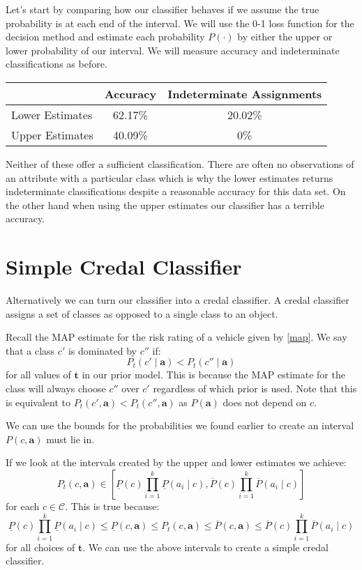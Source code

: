 Let's start by comparing how our classifier behaves if we assume the true probability is at each end of the interval.
We will use the 0-1 loss function for the decision method and estimate each probability $P(\cdot)$ by either the upper or lower probability of our interval.
We will measure accuracy and indeterminate classifications as before.

\begin{center}
	\begin{tabular}{l|c c}
	                & Accuracy & Indeterminate Assignments \\
	\hline
	Lower Estimates & 62.17\%  & 20.02\%            \\
	Upper Estimates & 40.09\%  & 0\%                \\
	\end{tabular}
\end{center}

Neither of these offer a sufficient classification.
There are often no observations of an attribute with a particular class which is why the lower estimates returns indeterminate classifications despite a reasonable accuracy for this data set.
On the other hand when using the upper estimates our classifier has a terrible accuracy.

\section{Simple Credal Classifier}
Alternatively we can turn our classifier into a credal classifier.
A credal classifier assigns a set of classes as opposed to a single class to an object.

Recall the MAP estimate for the risk rating of a vehicle given by \cref{map}.
We say that a class $c'$ is dominated by $c''$ if:
\begin{equation}\label{Credal Dominance}
	P_t(c' \mid \mathbf{a}) < P_t(c'' \mid \mathbf{a})
\end{equation}
for all values of $\mathbf{t}$ in our prior model.
This is because the MAP estimate for the class will always choose $c''$ over $c'$ regardless of which prior is used.
Note that this is equivalent to $P_t(c', \mathbf{a}) < P_t(c'', \mathbf{a})$ as $P(\mathbf{a})$ does not depend on $c$.

We can use the bounds for the probabilities we found earlier to create an interval $P(c, \mathbf{a})$ must lie in. 

If we look at the intervals created by the upper and lower estimates we achieve:
\begin{equation}
	P_t(c, \mathbf{a}) \in \left[ \underline{P}(c)\prod_{i=1}^k \underline{P}(a_i \mid c), \overline{P}(c)\prod_{i=1}^k \overline{P}(a_i \mid c) \right]
\end{equation}
for each $c \in \mathcal{C}$.
This is true because:
\begin{equation}
\underline{P}(c)\prod_{i=1}^k \underline{P}(a_i \mid c) \leq \underline{P}(c, \mathbf{a}) \leq P_t(c, \mathbf{a}) \leq \overline{P}(c, \mathbf{a}) \leq \overline{P}(c)\prod_{i=1}^k \overline{P}(a_i \mid c)
\end{equation}
for all choices of $\mathbf{t}$.
We can use the above intervals to create a simple credal classifier.

